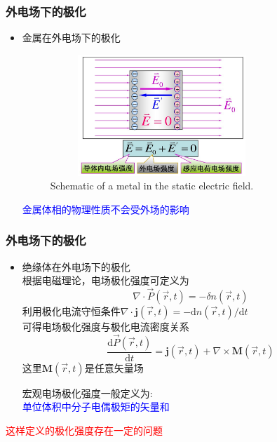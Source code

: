 \documentclass[cjk,slidestop,compress,mathserif,blue]{beamer}
\begin{document}
\frame
{
	\frametitle{外电场下的极化}
	\begin{itemize}
		\item 金属在外电场下的极化
\begin{figure}[h!]
\centering
\vspace*{-0.15in}
\includegraphics[height=1.8in,width=3.3in,viewport=0 0 1100 650,clip]{Figures/Polarize_metal-2.png}
\caption{\tiny \textrm{Schematic of a metal in the static electric field.}}%
\label{Polarization_metal}
\end{figure} 
\textcolor{blue}{金属体相的物理性质不会受外场的影响}
	\end{itemize}
}

\frame
{
	\frametitle{外电场下的极化}
	\begin{itemize}
		\item 绝缘体在外电场下的极化\\
			根据电磁理论，电场极化强度可定义为
			\begin{displaymath}
				\nabla\cdot\vec P(\vec r,t)=-\delta n(\vec r,t)
			\end{displaymath}
			利用极化电流守恒条件$\nabla\cdot\mathbf{j}(\vec r,t)=-\mathrm{d}n(\vec r,t)/\mathrm{d}t$\\
			可得电场极化强度与极化电流密度关系
			\begin{displaymath}
				\frac{\mathrm{d}\vec P(\vec r,t)}{\mathrm{d}t}=\mathbf{j}(\vec r,t)+\nabla\times\mathbf{M}(\vec r,t)
			\end{displaymath}
			这里$\mathbf{M}(\vec r,t)$是任意矢量场

			宏观电场极化强度一般定义为:\\\textcolor{blue}{单位体积中分子电偶极矩的矢量和}
	\end{itemize}
	\textcolor{red}{这样定义的极化强度存在一定的问题}
}
\end{document}
